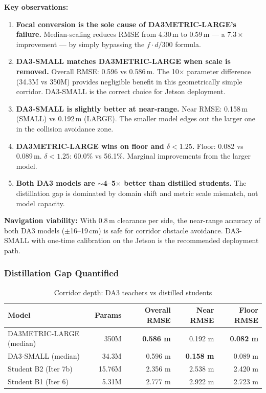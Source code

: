 \documentclass[11pt,a4paper]{article}
\begin{document}
\textbf{Key observations:}

\begin{enumerate}[nosep]
  \item \textbf{Focal conversion is the sole cause of DA3METRIC-LARGE's
    failure.} Median-scaling reduces RMSE from 4.30\,m to 0.59\,m ---
    a $7.3\times$ improvement --- by simply bypassing the
    $f \cdot d / 300$ formula.

  \item \textbf{DA3-SMALL matches DA3METRIC-LARGE when scale is removed.}
    Overall RMSE: 0.596 vs 0.586\,m. The 10$\times$ parameter
    difference (34.3M vs 350M) provides negligible benefit in this
    geometrically simple corridor. DA3-SMALL is the correct choice
    for Jetson deployment.

  \item \textbf{DA3-SMALL is slightly better at near-range.}
    Near RMSE: 0.158\,m (SMALL) vs 0.192\,m (LARGE). The smaller
    model edges out the larger one in the collision avoidance zone.

  \item \textbf{DA3METRIC-LARGE wins on floor and $\delta < 1.25$.}
    Floor: 0.082 vs 0.089\,m. $\delta < 1.25$: 60.0\% vs 56.1\%.
    Marginal improvements from the larger model.

  \item \textbf{Both DA3 models are $\sim$4--5$\times$ better than
    distilled students.} The distillation gap is dominated by domain
    shift and metric scale mismatch, not model capacity.
\end{enumerate}

\textbf{Navigation viability:} With 0.8\,m clearance per side, the
near-range accuracy of both DA3 models ($\pm$16--19\,cm) is safe for
corridor obstacle avoidance. DA3-SMALL with one-time calibration on
the Jetson is the recommended deployment path.

\subsubsection{Distillation Gap Quantified}

\begin{table}[h]
\centering
\caption{Corridor depth: DA3 teachers vs distilled students}
\label{tab:iter9-gap}
\begin{tabular}{lrrrr}
\toprule
\textbf{Model} & \textbf{Params} & \textbf{Overall RMSE} & \textbf{Near RMSE} & \textbf{Floor RMSE} \\
\midrule
DA3METRIC-LARGE (median) & 350M   & \textcolor{improved}{\textbf{0.586 m}} & 0.192 m & \textcolor{improved}{\textbf{0.082 m}} \\
DA3-SMALL (median)       & 34.3M  & 0.596 m & \textcolor{improved}{\textbf{0.158 m}} & 0.089 m \\
Student B2 (Iter 7b)     & 15.76M & 2.356 m & 2.538 m & 2.420 m \\
Student B1 (Iter 6)      & 5.31M  & 2.777 m & 2.922 m & 2.723 m \\
\bottomrule
\end{tabular}
\end{table}
\end{document}
